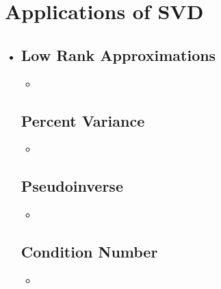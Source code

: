 \section{Applications of SVD}\label{Applications of SVD}
\begin{itemize}
  \item []
  
  \subsection{Low Rank Approximations}\label{Low Rank Approximations}
  \begin{itemize}
    \item 
  \end{itemize}

  \subsection{Percent Variance}\label{Percent Variance}
  \begin{itemize}
    \item 
  \end{itemize}
  
  \subsection{Pseudoinverse}\label{Pseudoinverse}
  \begin{itemize}
    \item 
  \end{itemize}

  \subsection{Condition Number}\label{Condition Number}
  \begin{itemize}
    \item 
  \end{itemize}
  
\end{itemize}



